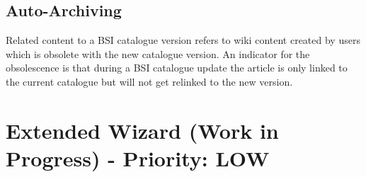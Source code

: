\subsection{Auto-Archiving}
\label{archive_relcon}
Related content to a BSI catalogue version refers to wiki content created by users which is obsolete with the new catalogue version. 
An indicator for the obsolescence is that during a BSI catalogue update the article is only linked to the current catalogue but will not get relinked to the new version.


\section{Extended Wizard (Work in Progress) - Priority: LOW}

